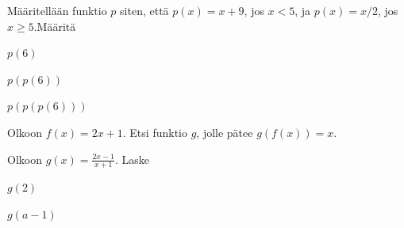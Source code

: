 \begin{tehtava}
Määritellään funktio $p$ siten, että $p(x)=x+9$, jos $x<5$, ja $p(x) = x/2$, jos $x\ge 5$.Määritä
\begin{kohdat}
\item \( p(6) \)
\item \( p(p(6)) \)
\item \( p(p(p(6)))\)
\end{kohdat}
\end{tehtava}

\begin{tehtava}
Olkoon $f(x) = 2x +1$. Etsi funktio $g$, jolle pätee $g(f(x)) = x$.
\end{tehtava}

\begin{tehtava}
Olkoon $\displaystyle g(x) = \frac{2x-1}{x+1}$. Laske
\begin{kohdat}
\item \(g(2)\)
\item \(g(a-1)\)
\end{kohdat}
\end{tehtava}
